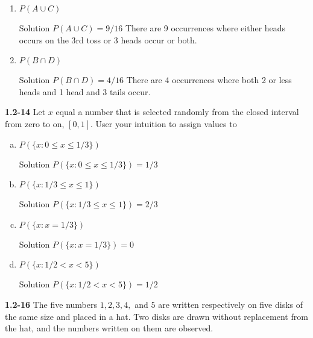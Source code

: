 \documentclass{article}
\begin{document}
\begin{spacing}{1.1}
\begin{homeworkProblem}
\begin{enumerate}[(a)]
\begin{enumerate}
				\item $P( A \cup C)$
					\begin{homeworkSection}{Solution}
						$P( A \cup C) = 9/16$ There are 9 occurrences where either heads occurs on the 3rd toss or 3 heads occur or both.
					\end{homeworkSection}	
				\item $P( B \cap D)$
					\begin{homeworkSection}{Solution}
						$P( B \cap D) = 4/16$ There are 4 occurrences where both 2 or less heads and 1 head and 3 tails occur.  
					\end{homeworkSection}	
			\end{enumerate}	
	\end{enumerate}
\end{homeworkProblem}
\begin{homeworkProblem}
	{\bf 1.2-14} Let $x$ equal a number that is selected randomly from the closed interval from zero to on, $[0,1]$.  User your intuition to assign values to 
	\begin{enumerate}[(a)]
		\item $P( \{x: 0 \le x \le 1/3 \})$
			\begin{homeworkSection}{Solution}
				$P( \{x: 0 \le x \le 1/3 \}) = 1/3$
			\end{homeworkSection}	
		\item $P( \{ x: 1/3 \le x \le 1 \})$
			\begin{homeworkSection}{Solution}
				$P( \{ x: 1/3 \le x \le 1 \}) = 2/3$	
			\end{homeworkSection}
		\item $P( \{ x: x = 1/3 \})$
			\begin{homeworkSection}{Solution}
				$P( \{ x: x = 1/3 \}) = 0$
			\end{homeworkSection}
		\item $P( \{x: 1/2 < x < 5 \})$
			\begin{homeworkSection}{Solution}
				$P( \{x: 1/2 < x < 5 \}) = 1/2$
			\end{homeworkSection}
	\end{enumerate}			
\end{homeworkProblem}
\begin{homeworkProblem}
	{\bf 1.2-16} The five numbers $1,2,3,4,$ and $5$ are written respectively on five disks of the same size and placed in a hat.  Two disks are drawn without replacement from the hat, and the numbers written on them are observed.  

\end{homeworkProblem}
\end{spacing}
\end{document}
